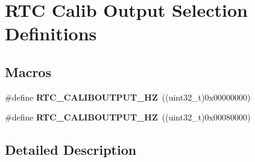 \hypertarget{group___r_t_c_ex___calib___output__selection___definitions}{}\section{R\+TC Calib Output Selection Definitions}
\label{group___r_t_c_ex___calib___output__selection___definitions}
\subsection*{Macros}
\begin{DoxyCompactItemize}
\item 
\#define {\bfseries R\+T\+C\+\_\+\+C\+A\+L\+I\+B\+O\+U\+T\+P\+U\+T\+\_\+HZ}~((uint32\+\_\+t)0x00000000)\hypertarget{group___r_t_c_ex___calib___output__selection___definitions_ga8647cd287c7dfe52f29793be07817bac}{}\label{group___r_t_c_ex___calib___output__selection___definitions_ga8647cd287c7dfe52f29793be07817bac}

\item 
\#define {\bfseries R\+T\+C\+\_\+\+C\+A\+L\+I\+B\+O\+U\+T\+P\+U\+T\+\_\+HZ}~((uint32\+\_\+t)0x00080000)\hypertarget{group___r_t_c_ex___calib___output__selection___definitions_gaf97fb10389fb13d16c2f2859f8d228c2}{}\label{group___r_t_c_ex___calib___output__selection___definitions_gaf97fb10389fb13d16c2f2859f8d228c2}

\end{DoxyCompactItemize}


\subsection{Detailed Description}
